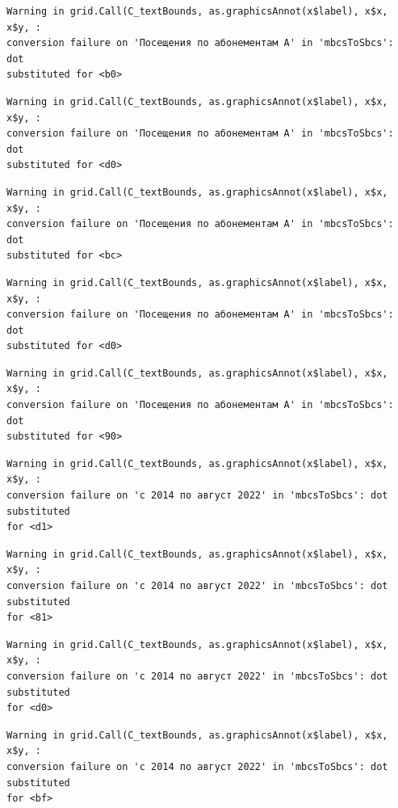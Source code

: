 \documentclass[
  letterpaper,
  DIV=11,
  numbers=noendperiod]{scrartcl}
\begin{document}
\begin{verbatim}
Warning in grid.Call(C_textBounds, as.graphicsAnnot(x$label), x$x, x$y, :
conversion failure on 'Посещения по абонементам А' in 'mbcsToSbcs': dot
substituted for <b0>
\end{verbatim}

\begin{verbatim}
Warning in grid.Call(C_textBounds, as.graphicsAnnot(x$label), x$x, x$y, :
conversion failure on 'Посещения по абонементам А' in 'mbcsToSbcs': dot
substituted for <d0>
\end{verbatim}

\begin{verbatim}
Warning in grid.Call(C_textBounds, as.graphicsAnnot(x$label), x$x, x$y, :
conversion failure on 'Посещения по абонементам А' in 'mbcsToSbcs': dot
substituted for <bc>
\end{verbatim}

\begin{verbatim}
Warning in grid.Call(C_textBounds, as.graphicsAnnot(x$label), x$x, x$y, :
conversion failure on 'Посещения по абонементам А' in 'mbcsToSbcs': dot
substituted for <d0>
\end{verbatim}

\begin{verbatim}
Warning in grid.Call(C_textBounds, as.graphicsAnnot(x$label), x$x, x$y, :
conversion failure on 'Посещения по абонементам А' in 'mbcsToSbcs': dot
substituted for <90>
\end{verbatim}

\begin{verbatim}
Warning in grid.Call(C_textBounds, as.graphicsAnnot(x$label), x$x, x$y, :
conversion failure on 'с 2014 по август 2022' in 'mbcsToSbcs': dot substituted
for <d1>
\end{verbatim}

\begin{verbatim}
Warning in grid.Call(C_textBounds, as.graphicsAnnot(x$label), x$x, x$y, :
conversion failure on 'с 2014 по август 2022' in 'mbcsToSbcs': dot substituted
for <81>
\end{verbatim}

\begin{verbatim}
Warning in grid.Call(C_textBounds, as.graphicsAnnot(x$label), x$x, x$y, :
conversion failure on 'с 2014 по август 2022' in 'mbcsToSbcs': dot substituted
for <d0>
\end{verbatim}

\begin{verbatim}
Warning in grid.Call(C_textBounds, as.graphicsAnnot(x$label), x$x, x$y, :
conversion failure on 'с 2014 по август 2022' in 'mbcsToSbcs': dot substituted
for <bf>
\end{verbatim}
\end{document}

